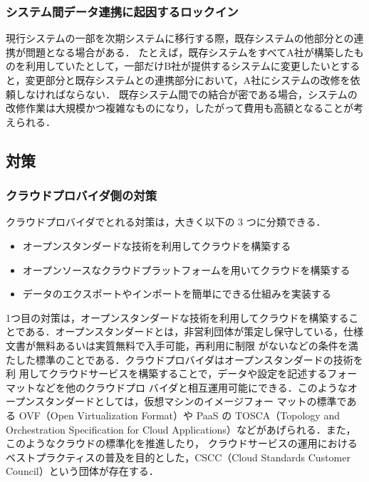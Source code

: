 \subsubsection{システム間データ連携に起因するロックイン}
現行システムの一部を次期システムに移行する際，既存システムの他部分との連携が問題となる場合がある．
たとえば，既存システムをすべてA社が構築したものを利用していたとして，一部だけB社が提供するシステムに変更したいとすると，変更部分と既存システムとの連携部分において，A社にシステムの改修を依頼しなければならない．
既存システム間での結合が密である場合，システムの改修作業は大規模かつ複雑なものになり，したがって費用も高額となることが考えられる．

\subsection{対策}

\subsubsection{クラウドプロバイダ側の対策}
クラウドプロバイダでとれる対策は，大きく以下の 3 つに分類できる．
\begin{itemize}
\item オープンスタンダードな技術を利用してクラウドを構築する
\item オープンソースなクラウドプラットフォームを用いてクラウドを構築する
\item データのエクスポートやインポートを簡単にできる仕組みを実装する
\end{itemize}

1つ目の対策は，オープンスタンダードな技術を利用してクラウドを構築することである．オープンスタンダードとは，非営利団体が策定し保守している，仕様文書が無料あるいは実質無料で入手可能，再利用に制限 がないなどの条件を満たした標準のことである\cite{openstandard}．クラウドプロバイダはオープンスタンダードの技術を利 用してクラウドサービスを構築することで，データや設定を記述するフォーマットなどを他のクラウドプロ バイダと相互運用可能にできる．このようなオープンスタンダードとしては，仮想マシンのイメージフォー マットの標準である OVF（Open Virtualization Format）\cite{ovf}や PaaS の TOSCA（Topology and Orchestration Specification for Cloud Applications）\cite{tosca}などがあげられる．また，このようなクラウドの標準化を推進したり， クラウドサービスの運用におけるベストプラクティスの普及を目的とした，CSCC（Cloud Standards Customer Council）\cite{cscc}という団体が存在する．

